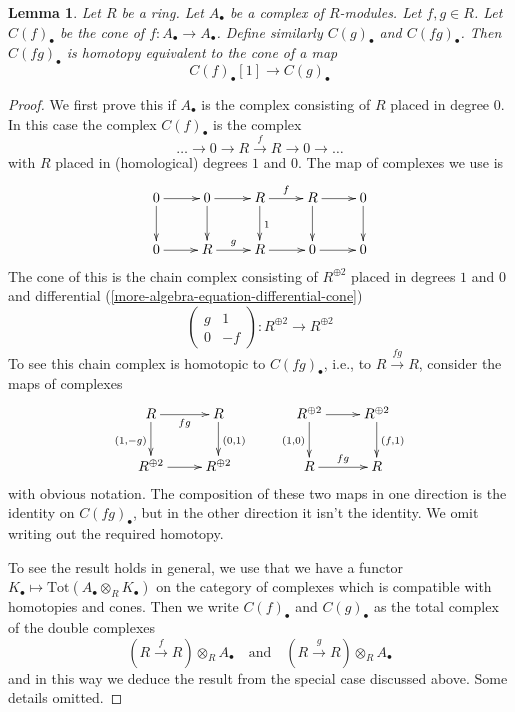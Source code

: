 \documentclass{amsart}
\theoremstyle{plain}
\newtheorem{lemma}[subsection]{Lemma}
\theoremstyle{definition}
\theoremstyle{remark}
\numberwithin{equation}{subsection}
\begin{document}
\begin{lemma}
\label{more-algebra-lemma-cone-squared}
Let $R$ be a ring. Let $A_\bullet$ be a complex of $R$-modules.
Let $f, g \in R$. Let $C(f)_\bullet$ be the cone of
$f : A_\bullet \to A_\bullet$. Define similarly $C(g)_\bullet$ and
$C(fg)_\bullet$. Then $C(fg)_\bullet$ is homotopy equivalent to the
cone of a map
$$
C(f)_\bullet[1] \longrightarrow C(g)_\bullet
$$
\end{lemma}

\begin{proof}
We first prove this if $A_\bullet$ is the complex consisting of $R$ placed
in degree $0$. In this case the complex $C(f)_\bullet$ is the
complex
$$
\ldots \to 0 \to R \xrightarrow{f} R \to 0 \to \ldots
$$
with $R$ placed in (homological) degrees $1$ and $0$. The map
of complexes we use is
$$
\xymatrix{
0 \ar[r] \ar[d] &
0 \ar[r] \ar[d] &
R \ar[r]^f \ar[d]^1 &
R \ar[r] \ar[d] & 0 \ar[d] \\
0 \ar[r] & R \ar[r]^g & R \ar[r] & 0 \ar[r] & 0
}
$$
The cone of this is the chain complex consisting of $R^{\oplus 2}$ placed in
degrees $1$ and $0$ and differential (\ref{more-algebra-equation-differential-cone})
$$
\left(
\begin{matrix}
g & 1 \\
0 & -f
\end{matrix}
\right) :
R^{\oplus 2} \longrightarrow R^{\oplus 2}
$$
To see this chain complex is homotopic to
$C(fg)_\bullet$, i.e., to $R \xrightarrow{fg} R$,
consider the maps of complexes
$$
\xymatrix{
R \ar[d]_{(1, -g)} \ar[r]_{fg} & R \ar[d]^{(0, 1)} \\
R^{\oplus 2} \ar[r] & R^{\oplus 2}
}
\quad\quad
\xymatrix{
R^{\oplus 2} \ar[d]_{(1, 0)} \ar[r] & R^{\oplus 2} \ar[d]^{(f, 1)} \\
R \ar[r]^{fg} & R
}
$$
with obvious notation.
The composition of these two maps in one direction is the
identity on $C(fg)_\bullet$, but in the other direction
it isn't the identity. We omit writing out the required homotopy.

\medskip\noindent
To see the result holds in general, we use that we have a functor
$K_\bullet \mapsto \text{Tot}(A_\bullet \otimes_R K_\bullet)$
on the category of complexes which is compatible with homotopies
and cones. Then we write $C(f)_\bullet$ and $C(g)_\bullet$
as the total complex of the double complexes
$$
(R \xrightarrow{f} R) \otimes_R A_\bullet
\quad\text{and}\quad
(R \xrightarrow{g} R) \otimes_R A_\bullet
$$
and in this way we deduce the result from the special case discussed above.
Some details omitted.
\end{proof}
\end{document}
